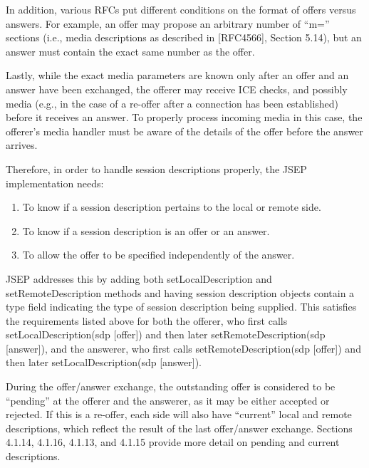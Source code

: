 \documentclass{article}
\begin{document}
In addition, various RFCs put different conditions on the format of
offers versus answers.  For example, an offer may propose an
arbitrary number of ``m='' sections (i.e., media descriptions as
described in [RFC4566], Section 5.14), but an answer must contain the
exact same number as the offer.

Lastly, while the exact media parameters are known only after an
offer and an answer have been exchanged, the offerer may receive ICE
checks, and possibly media (e.g., in the case of a re-offer after a
connection has been established) before it receives an answer.  To
properly process incoming media in this case, the offerer's media
handler must be aware of the details of the offer before the answer
arrives.

Therefore, in order to handle session descriptions properly, the JSEP
implementation needs:

\begin{enumerate}
  \item To know if a session description pertains to the local or remote
    side.

  \item To know if a session description is an offer or an answer.

  \item To allow the offer to be specified independently of the answer.
\end{enumerate}

JSEP addresses this by adding both setLocalDescription and
setRemoteDescription methods and having session description objects
contain a type field indicating the type of session description being
supplied.  This satisfies the requirements listed above for both the
offerer, who first calls setLocalDescription(sdp [offer]) and then
later setRemoteDescription(sdp [answer]), and the answerer, who first
calls setRemoteDescription(sdp [offer]) and then later
setLocalDescription(sdp [answer]).

During the offer/answer exchange, the outstanding offer is considered
to be ``pending'' at the offerer and the answerer, as it may be either
accepted or rejected.  If this is a re-offer, each side will also
have ``current'' local and remote descriptions, which reflect the
result of the last offer/answer exchange.  Sections 4.1.14, 4.1.16,
4.1.13, and 4.1.15 provide more detail on pending and current
descriptions.
\end{document}
